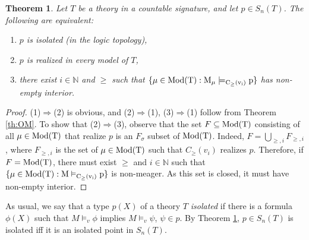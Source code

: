 \documentclass[12pt]{amsart}
\theoremstyle{plain}
\newtheorem{theorem}{Theorem}[section]
\newcommand \Mod{\rm{Mod}}
\newcommand \tp{\rm{tp}}
\newcommand \NN{\mathbb{N}}
\begin{document}
	
	\begin{theorem}
		\label{th:OM-TFAE}
		Let $T$ be a theory in a countable signature, and let $p \in S_n(T)$. The following are equivalent:
		\begin{enumerate}
			\item $p$ is isolated (in the logic topology),
			\item $p$ is realized in every model of $T$,
			\item there exist $i \in \NN$ and $\geq$  such that $\{\mu \in \Mod(T): M_\mu \models_{C_\geq(v_i)} p \}$ has non-empty interior.
		\end{enumerate}
	\end{theorem}
	
	\begin{proof}
		(1)$\Rightarrow$(2) is obvious, and (2)$\Rightarrow$(1), (3)$\Rightarrow$(1) follow from Theorem \ref{th:OM}. To show that (2)$\Rightarrow$(3), observe that the set $F \subseteq \Mod(T)$ consisting of all $\mu \in \Mod(T)$ that realize $p$ is an $F_\sigma$ subset of $\Mod(T)$. Indeed, $F=\bigcup_{\geq,i} F_{\geq,i}$, where $F_{\geq,i}$ is the set of $\mu \in \Mod(T)$ such that $C_\geq(v_i)$ realizes $p$. Therefore, if $F=\Mod(T)$, there must exist  $\geq$ and $i \in \NN$ such that $\{\mu \in \Mod(T): M \vDash_{C_\geq(v_i)} p \}$ is non-meager. As this set is closed, it must have non-empty interior.
	\end{proof}
	
As usual, we say that a type $p(X)$ of a theory $T$ \emph{isolated} if there is a formula $\phi(X)$ such that $M \models_v \phi$ implies $M \models_v \psi$, $\psi \in p$. By Theorem \ref{th:OM-TFAE}, $p \in S_n(T)$ is isolated iff it is an isolated point in $S_n(T)$.
\end{document}
